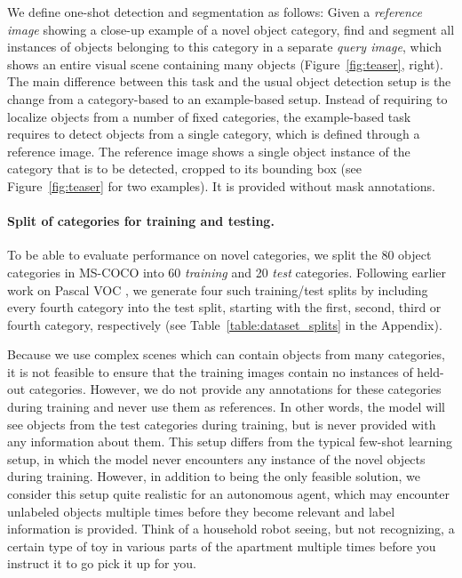 \documentclass{article}
\newcommand{\coco}{MS-COCO\xspace}
\begin{document}
We define one-shot detection and segmentation as follows: Given a \emph{reference image} showing a close-up example of a novel object category, find and segment all instances of objects belonging to this category in a separate \emph{query image}, which shows an entire visual scene containing many objects (Figure~\ref{fig:teaser}, right). The main difference between this task and the usual object detection setup is the change from a category-based to an example-based setup. Instead of requiring to localize objects from a number of fixed categories, the example-based task requires to detect objects from a single category, which is defined through a reference image. The reference image shows a single object instance of the category that is to be detected, cropped to its bounding box (see Figure~\ref{fig:teaser} for two examples). It is provided without mask annotations.


\paragraph{Split of categories for training and testing.}

To be able to evaluate performance on novel categories, we split the 80 object categories in \coco into 60 \emph{training} and 20 \emph{test} categories.
Following earlier work on Pascal VOC \cite{Shaban2017}, we generate four such training/test splits by including every fourth category into the test split, starting with the first, second, third or fourth category, respectively (see Table~\ref{table:dataset_splits} in the Appendix).

Because we use complex scenes which can contain objects from many categories, it is not feasible to ensure that the training images contain no instances of held-out categories. However, we do not provide any annotations for these categories during training and never use them as references. In other words, the model will see objects from the test categories during training, but is never provided with any information about them. This setup differs from the typical few-shot learning setup, in which the model never encounters any instance of the novel objects during training. However, in addition to being the only feasible solution, we consider this setup quite realistic for an autonomous agent, which may encounter unlabeled objects multiple times before they become relevant and label information is provided. Think of a household robot seeing, but not recognizing, a certain type of toy in various parts of the apartment multiple times before you instruct it to go pick it up for you.
\end{document}
